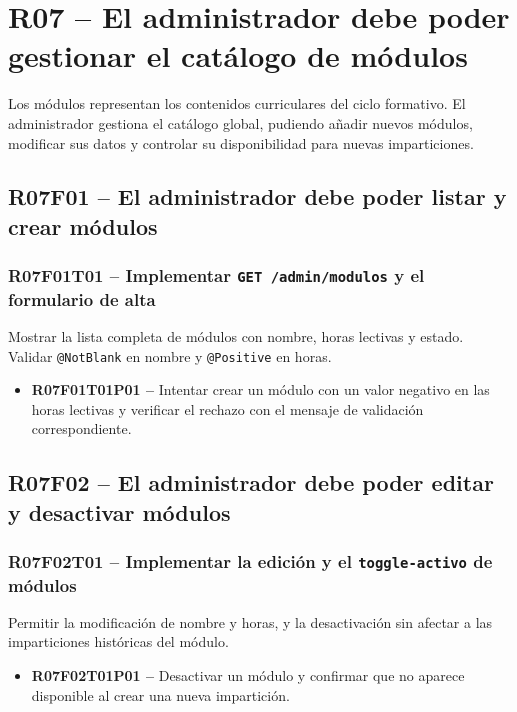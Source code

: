 \documentclass[12pt, a4paper]{report}
\begin{document}
\section{R07 -- El administrador debe poder gestionar el catálogo de módulos}

Los módulos representan los contenidos curriculares del ciclo formativo. El administrador gestiona el catálogo global, pudiendo añadir nuevos módulos, modificar sus datos y controlar su disponibilidad para nuevas imparticiones.

\subsection{R07F01 -- El administrador debe poder listar y crear módulos}

\subsubsection{R07F01T01 -- Implementar \texttt{GET /admin/modulos} y el formulario de alta}
Mostrar la lista completa de módulos con nombre, horas lectivas y estado. Validar \texttt{@NotBlank} en nombre y \texttt{@Positive} en horas.
\begin{itemize}
  \item \textbf{R07F01T01P01 --} Intentar crear un módulo con un valor negativo en las horas lectivas y verificar el rechazo con el mensaje de validación correspondiente.
\end{itemize}

\subsection{R07F02 -- El administrador debe poder editar y desactivar módulos}

\subsubsection{R07F02T01 -- Implementar la edición y el \texttt{toggle-activo} de módulos}
Permitir la modificación de nombre y horas, y la desactivación sin afectar a las imparticiones históricas del módulo.
\begin{itemize}
  \item \textbf{R07F02T01P01 --} Desactivar un módulo y confirmar que no aparece disponible al crear una nueva impartición.
\end{itemize}
\end{document}
